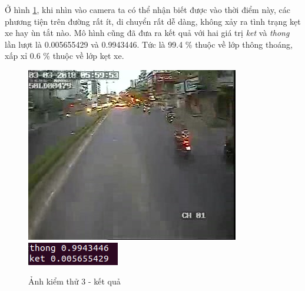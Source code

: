 	
	Ở hình \ref{fig:test3}, khi nhìn vào camera ta có thể nhận biết được vào thời điểm này, các phương tiện trên đường rất ít, di chuyển rất dễ dàng, không xảy ra tình trạng kẹt xe hay ùn tắt nào. Mô hình cũng đã đưa ra kết quả với hai giá trị \textit{ket} và \textit{thong} lần lượt là 0.005655429 và 0.9943446. Tức là 99.4 \% thuộc về lớp thông thoáng, xấp xỉ 0.6 \% thuộc về lớp kẹt xe. \par
	\begin{figure}[h!]
		\centering
		\includegraphics[scale=1]{charts/image0125.jpg}
		\includegraphics[scale=0.5]{charts/most-last-res.png}
		\caption{Ảnh kiểm thử 3 - kết quả}
		\label{fig:test3}
	\end{figure}
	
